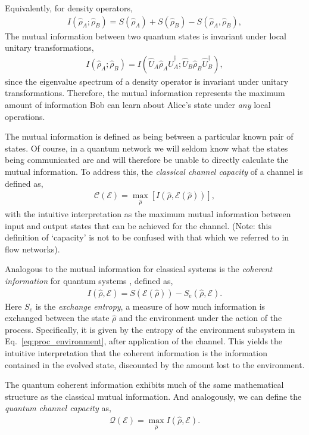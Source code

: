 \documentclass[aps,rmp,twocolumn,amsmath,amssymb,nofootinbib,superscriptaddress,longbibliography,floatfix]{revtex4-1}
\newcommand{\comment}[1]{{\color{blue}{\textbf{#1}}}}
\begin{document}
Equivalently, for density operators,
\begin{align}
I(\hat\rho_A;\hat\rho_B) = S(\hat\rho_A) + S(\hat\rho_B) - S(\hat\rho_A,\hat\rho_B),
\end{align}
The mutual information between two quantum states is invariant under local unitary transformations,
\begin{align}
I(\hat\rho_A;\hat\rho_B) = I(\hat{U}_A\hat\rho_A \hat{U}_A^\dag; \hat{U}_B\hat\rho_B \hat{U}_B^\dag),
\end{align}
since the eigenvalue spectrum of a density operator is invariant under unitary transformations. Therefore, the mutual information represents the maximum amount of information Bob can learn about Alice's state under \emph{any} local operations.

The mutual information is defined as being between a particular known pair of states. Of course, in a quantum network we will seldom know what the states being communicated are and will therefore be unable to directly calculate the mutual information. To address this, the \emph{classical channel capacity} of a channel is defined as,
\begin{align}
\mathcal{C}(\mathcal{E}) = \max_{\hat\rho} [I(\hat\rho,\mathcal{E}(\hat\rho))],
\end{align}
with the intuitive interpretation as the maximum mutual information between input and output states that can be achieved for the channel. (Note: this definition of `capacity' is not to be confused with that which we referred to in flow networks).

Analogous to the mutual information for classical systems is the \emph{coherent information} for quantum systems \cite{???}, defined as,
\begin{align}
I(\hat\rho,\mathcal{E}) = S(\mathcal{E}(\hat\rho)) - S_e(\hat\rho,\mathcal{E}).
\end{align}
\comment{Check up on this coherent information stuff!} Here $S_e$ is the \emph{exchange entropy}, a measure of how much information is exchanged between the state $\hat\rho$ and the environment under the action of the process. Specifically, it is given by the entropy of the environment subsystem in Eq.~\ref{eq:proc_environment}, after application of the channel. This yields the intuitive interpretation that the coherent information is the information contained in the evolved state, discounted by the amount lost to the environment.

The quantum coherent information exhibits much of the same mathematical structure as the classical mutual information. And analogously, we can define the \emph{quantum channel capacity} as,
\begin{align}
\mathcal{Q}(\mathcal{E}) = \max_{\hat\rho} I(\hat\rho,\mathcal{E}).
\end{align}
\end{document}
